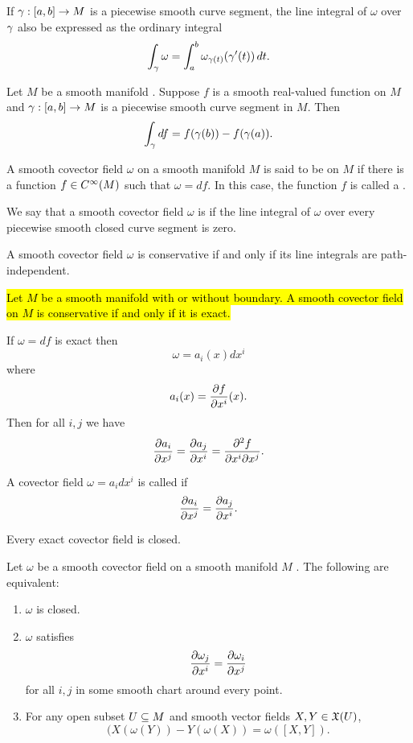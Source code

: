 \begin{prop}
If $\gamma:[a,b]\rightarrow M$ is a piecewise smooth curve segment, the line integral of $\omega$ over $\gamma$ also be expressed as the ordinary integral
\[\int_\gamma \omega = \int_a^b \omega_{\gamma(t)}(\gamma^\prime(t))\,dt.\]
\end{prop}

\begin{thm}
Let $M$ be a smooth manifold \wowob. Suppose $f$ is a smooth real-valued function on $M$ and $\gamma:[a,b]\rightarrow M$ is a piecewise smooth curve segment in $M$. Then
\[\int_\gamma df = f(\gamma(b)) - f(\gamma(a)).\]
\end{thm}

\dfng A smooth covector field $\omega$ on a smooth manifold $M$ \wowob is said to be  on $M$ if there is a function $f\in C^\infty(M)$ such that $\omega = df$. In this case, the function $f$ is called a .

\dfng We say that a smooth covector field $\omega$ is  if the line integral of $\omega$ over every piecewise smooth closed curve segment is zero.

\begin{prop}
A smooth covector field $\omega$ is conservative if and only if its line integrals are path-independent.
\end{prop}

\setcounter{thm}{41}

\begin{thm}
\hl{Let $M$ be a smooth manifold with or without boundary. A smooth covector field on $M$ is conservative if and only if it is exact.}
\end{thm}

\crly If $\omega = df$ is exact then
\[\omega = a_i(x)dx^i\]
where
\[a_i(x) = \frac{\partial{f}}{\partial{x^i}}(x).\]
Then for all $i,j$ we have
\[\frac{\partial{a_i}}{\partial{x^j}} = \frac{\partial{a_j}}{\partial{x^i}} = \frac{\partial^2 f}{\partial x^i \partial x^j}.\]

\dfn A covector field $\omega = a_i dx^i$ is called  if
\[\frac{\partial{a_i}}{\partial{x^j}} = \frac{\partial{a_j}}{\partial{x^i}}.\]

\setcounter{thm}{43}

\begin{prop}
Every exact covector field is closed.
\end{prop}

\begin{prop}
Let $\omega$ be a smooth covector field on a smooth manifold $M$ \wowob. The following are equivalent:
\begin{enumerate}
    \item $\omega$ is closed.
    \item $\omega$ satisfies
    \[\frac{\partial{\omega_j}}{\partial{x^i}} = \frac{\partial{\omega_i}}{\partial{x^j}}\]
    for all $i,j$ in some smooth chart around every point.
    \item For any open subset $U\subseteq M$ and smooth vector fields $X,Y\in \mathfrak{X}(U)$,
    \[(X(\omega(Y)) - Y(\omega(X)) = \omega([X,Y]).\]
\end{enumerate}
\end{prop}

